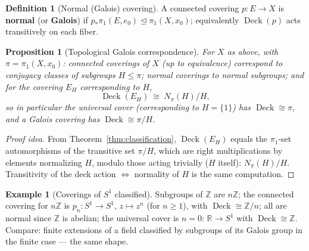 \documentclass[11pt,a4paper]{article}
\newtheorem{proposition}[theorem]{Proposition}
\theoremstyle{definition}
\newtheorem{definition}[theorem]{Definition}
\newtheorem{example}[theorem]{Example}
\newcommand{\Z}{\mathbb{Z}}
\newcommand{\R}{\mathbb{R}}
\newcommand{\Deck}{\operatorname{Deck}}
\begin{document}
	\begin{definition}[Normal (Galois) covering]
		A connected covering $p:E\to X$ is \textbf{normal} (or \textbf{Galois}) if
		$p_*\pi_1(E,e_0)\trianglelefteq\pi_1(X,x_0)$; equivalently $\Deck(p)$ acts transitively on each fiber.
	\end{definition}
	
	\begin{proposition}[Topological Galois correspondence]\label{prop:galois-corr}
		For $X$ as above, with $\pi=\pi_1(X,x_0)$: connected coverings of $X$ (up to equivalence)
		correspond to conjugacy classes of subgroups $H\le\pi$; normal coverings to normal subgroups; and
		for the covering $E_H$ corresponding to $H$,
		\[
		\Deck(E_H)\ \cong\ N_\pi(H)/H,
		\]
		so in particular the universal cover (corresponding to $H=\{1\}$) has $\Deck\cong\pi$, and a Galois
		covering has $\Deck\cong\pi/H$.
	\end{proposition}
	\begin{proof}[Proof idea]
		From Theorem~\ref{thm:classification}, $\Deck(E_H)$ equals the $\pi_1$-set automorphisms of the
		transitive set $\pi/H$, which are right multiplications by elements normalizing $H$, modulo those
		acting trivially ($H$ itself): $N_\pi(H)/H$. Transitivity of the deck action $\iff$ normality of $H$
		is the same computation.
	\end{proof}
	
	\begin{example}[Coverings of $S^1$ classified]
		Subgroups of $\Z$ are $n\Z$; the connected covering for $n\Z$ is $p_n:S^1\to S^1$, $z\mapsto z^n$
		(for $n\ge1$), with $\Deck\cong\Z/n$; all are normal since $\Z$ is abelian; the universal cover is
		$n=0$: $\R\to S^1$ with $\Deck\cong\Z$. Compare: finite extensions of a field classified by
		subgroups of its Galois group in the finite case --- the same shape.
	\end{example}
	
\end{document}
